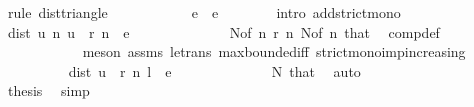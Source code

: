 \begin{isabellebody}
\ {\isacharparenleft}{\kern0pt}rule\ dist{\isacharunderscore}{\kern0pt}triangle{\isacharparenright}{\kern0pt}\isanewline
\ \ \ \ \ \ \isamarkupfalse%
\ \isamarkupfalse%
\ {\isachardoublequoteopen}{\isasymdots}\ {\isacharless}{\kern0pt}\ e{\isacharslash}{\kern0pt}{}\ {\isacharplus}{\kern0pt}\ e{\isacharslash}{\kern0pt}{}{\isachardoublequoteclose}\isanewline
\ \ \ \ \ \ \isamarkupfalse%
\ {\isacharparenleft}{\kern0pt}intro\ add{\isacharunderscore}{\kern0pt}strict{\isacharunderscore}{\kern0pt}mono{\isacharparenright}{\kern0pt}\isanewline
\ \ \ \ \ \ \ \ \isamarkupfalse%
\ {\isachardoublequoteopen}dist\ {\isacharparenleft}{\kern0pt}u\ n{\isacharparenright}{\kern0pt}\ {\isacharparenleft}{\kern0pt}{\isacharparenleft}{\kern0pt}u\ {\isasymcirc}\ r{\isacharparenright}{\kern0pt}\ n{\isacharparenright}{\kern0pt}\ {\isacharless}{\kern0pt}\ e\ {\isacharslash}{\kern0pt}\ {}{\isachardoublequoteclose}\isanewline
\ \ \ \ \ \ \ \ \ \ \isamarkupfalse%
\ N{}{\isacharbrackleft}{\kern0pt}of\ n\ {\isachardoublequoteopen}r\ n{\isachardoublequoteclose}{\isacharbrackright}{\kern0pt}\ N{}{\isacharbrackleft}{\kern0pt}of\ n{\isacharbrackright}{\kern0pt}\ that\ \isamarkupfalse%
\ comp{\isacharunderscore}{\kern0pt}def\isanewline
\ \ \ \ \ \ \ \ \ \ \isamarkupfalse%
\ {\isacharparenleft}{\kern0pt}meson\ assms{\isacharparenleft}{\kern0pt}{}{\isacharparenright}{\kern0pt}\ le{\isacharunderscore}{\kern0pt}trans\ max{\isachardot}{\kern0pt}bounded{\isacharunderscore}{\kern0pt}iff\ strict{\isacharunderscore}{\kern0pt}mono{\isacharunderscore}{\kern0pt}imp{\isacharunderscore}{\kern0pt}increasing{\isacharparenright}{\kern0pt}\isanewline
\ \ \ \ \ \ \ \ \isamarkupfalse%
\ {\isachardoublequoteopen}dist\ {\isacharparenleft}{\kern0pt}{\isacharparenleft}{\kern0pt}u\ {\isasymcirc}\ r{\isacharparenright}{\kern0pt}\ n{\isacharparenright}{\kern0pt}\ l\ {\isacharless}{\kern0pt}\ e\ {\isacharslash}{\kern0pt}\ {}{\isachardoublequoteclose}\isanewline
\ \ \ \ \ \ \ \ \ \ \isamarkupfalse%
\ N{}\ that\ \isamarkupfalse%
\ auto\isanewline
\ \ \ \ \ \ \isamarkupfalse%
\isanewline
\ \ \ \ \ \ \isamarkupfalse%
\ \isamarkupfalse%
\ {\isacharquery}{\kern0pt}thesis\ \isamarkupfalse%
\ simp\isanewline
\ \ \ \ \isamarkupfalse%
\ \isanewline
\ \ \ \ \isamarkupfalse%

\end{isabellebody}
